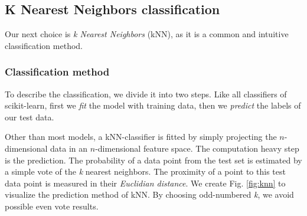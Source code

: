 \subsection{K Nearest Neighbors classification}\label{sec:kNN}
Our next choice is \emph{k Nearest Neighbors} (kNN), as it is a common and intuitive classification method. 

\subsubsection{Classification method}
To describe the classification, we divide it into two steps. Like all classifiers of scikit-learn, first we \emph{fit} the model with training data, then we \emph{predict} the labels of our test data.

Other than most models, a kNN-classifier is fitted by simply projecting the $n$-dimensional data in an $n$-dimensional feature space. The computation heavy step is the prediction. The probability of a data point from the test set is estimated by a simple vote of the \emph{k} nearest neighbors. The proximity of a point to this test data point is measured in their \emph{Euclidian distance}. We create Fig. \ref{fig:knn} to visualize the prediction method of kNN. By choosing odd-numbered \emph{k}, we avoid possible even vote results.

